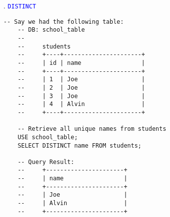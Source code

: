 \newpage
{}. \textcolor{blue}{\texttt{DISTINCT}}

\begin{lstlisting}[style=sql]
    -- Say we had the following table:
    -- DB: school_table
    --
    --     students
    --     +----+----------------------+
    --     | id | name                 |
    --     +----+----------------------+
    --     | 1  | Joe                  |
    --     | 2  | Joe                  |
    --     | 3  | Joe                  |
    --     | 4  | Alvin                |
    --     +----+----------------------+

    -- Retrieve all unique names from students
    USE school_table;
    SELECT DISTINCT name FROM students;

    -- Query Result:
    --     +----------------------+
    --     | name                 |
    --     +----------------------+
    --     | Joe                  |
    --     | Alvin                |
    --     +----------------------+
\end{lstlisting}